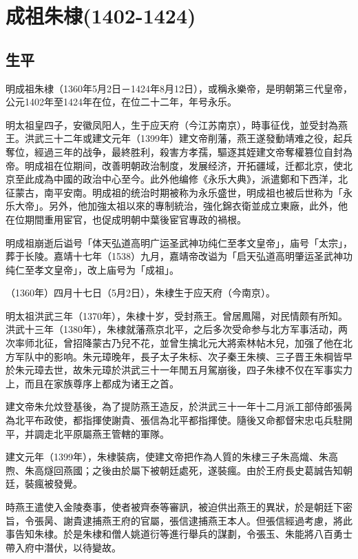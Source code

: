 
\section{成祖朱棣\tiny(1402-1424)}

\subsection{生平}

明成祖朱棣（1360年5月2日－1424年8月12日），或稱永樂帝，是明朝第三代皇帝，公元1402年至1424年在位，在位二十二年，年号永乐。

明太祖皇四子，安徽凤阳人，生于应天府（今江苏南京），時事征伐，並受封為燕王。洪武三十二年或建文元年（1399年）建文帝削藩，燕王遂發動靖难之役，起兵奪位，經過三年的战争，最終胜利，殺害方孝孺，驅逐其姪建文帝奪權篡位自封為帝。明成祖在位期间，改善明朝政治制度，发展经济，开拓疆域，迁都北京，使北京至此成為中國的政治中心至今。此外他编修《永乐大典》，派遣鄭和下西洋，北征蒙古，南平安南。明成祖的统治时期被称为永乐盛世，明成祖也被后世称为「永乐大帝」。另外，他加強太祖以來的專制統治，強化錦衣衛並成立東廠，此外，他在位期間重用宦官，也促成明朝中葉後宦官專政的禍根。

明成祖崩逝后谥号「体天弘道高明广运圣武神功纯仁至孝文皇帝」，庙号「太宗」，葬于长陵。嘉靖十七年（1538）九月，嘉靖帝改谥为「启天弘道高明肇运圣武神功纯仁至孝文皇帝」，改上庙号为「成祖」。

（1360年）四月十七日（5月2日），朱棣生于应天府（今南京）。

明太祖洪武三年（1370年），朱棣十岁，受封燕王。曾居鳳陽，对民情颇有所知。洪武十三年（1380年），朱棣就藩燕京北平，之后多次受命参与北方军事活动，两次率师北征，曾招降蒙古乃兒不花，並曾生擒北元大將索林帖木兒，加强了他在北方军队中的影响。朱元璋晚年，長子太子朱标、次子秦王朱樉、三子晋王朱棡皆早於朱元璋去世，故朱元璋於洪武三十一年閒五月駕崩後，四子朱棣不仅在军事实力上，而且在家族尊序上都成为诸王之首。

建文帝朱允炆登基後，為了提防燕王造反，於洪武三十一年十二月派工部侍郎張昺為北平布政使，都指揮使謝貴、張信為北平都指揮使。隨後又命都督宋忠屯兵駐開平，并調走北平原屬燕王管轄的軍隊。

建文元年（1399年），朱棣裝病，使建文帝把作為人質的朱棣三子朱高熾、朱高煦、朱高燧回燕國；之後由於屬下被朝廷處死，遂裝瘋。由於王府長史葛誠告知朝廷，裝瘋被發覺。

時燕王遣使入金陵奏事，使者被齊泰等審訊，被迫供出燕王的異狀，於是朝廷下密旨，令張昺、謝貴逮捕燕王府的官屬，張信逮捕燕王本人。但張信經過考慮，將此事告知朱棣。於是朱棣和僧人姚道衍等進行舉兵的謀劃，令張玉、朱能將八百勇士帶入府中潛伏，以待變故。

